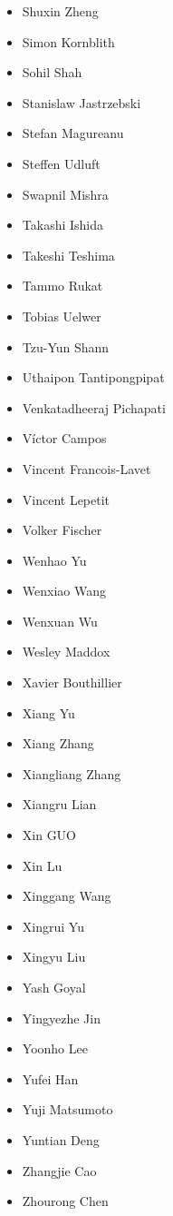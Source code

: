 \begin{multicols}{3}
\begin{itemize}[label={}]
    \item Shuxin Zheng
    \item Simon Kornblith
    \item Sohil Shah
    \item Stanislaw Jastrzebski
    \item Stefan Magureanu
    \item Steffen Udluft
    \item Swapnil Mishra
    \item Takashi Ishida
    \item Takeshi Teshima
    \item Tammo Rukat
    \item Tobias Uelwer
    \item Tzu-Yun Shann
    \item Uthaipon Tantipongpipat
    \item Venkatadheeraj Pichapati
    \item Víctor Campos
    \item Vincent Francois-Lavet
    \item Vincent Lepetit
    \item Volker Fischer
    \item Wenhao Yu
    \item Wenxiao Wang
    \item Wenxuan Wu
    \item Wesley Maddox
    \item Xavier Bouthillier
    \item Xiang Yu
    \item Xiang Zhang
    \item Xiangliang Zhang
    \item Xiangru Lian
    \item Xin GUO
    \item Xin Lu
    \item Xinggang Wang
    \item Xingrui Yu
    \item Xingyu Liu
    \item Yash Goyal
    \item Yingyezhe Jin
    \item Yoonho Lee
    \item Yufei Han
    \item Yuji Matsumoto
    \item Yuntian Deng
    \item Zhangjie Cao
    \item Zhourong Chen
\end{itemize}
\end{multicols}
\endgroup
